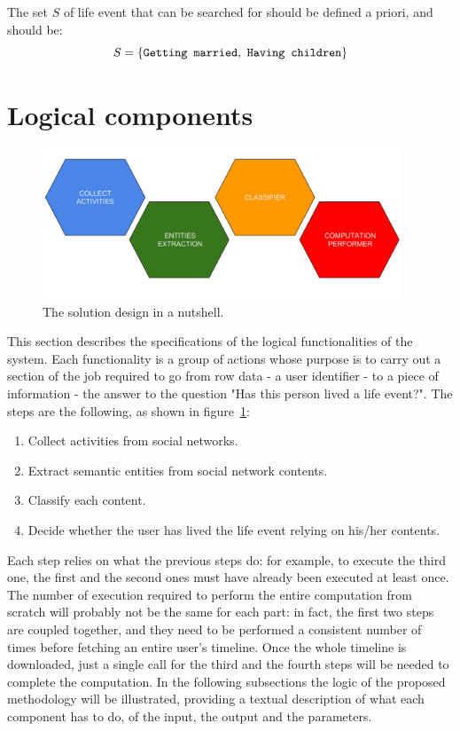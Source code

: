 The set $S$ of life event that can be searched for should be defined a priori, and should be: 
\[
S = \{\text{\texttt{Getting married}}, \text{ \texttt{Having children}}\}
\]

\section{Logical components}
\label{sec:logicdescr}

\begin{figure}[b]
\centering
\includegraphics[width=%
0.95\textwidth]{img/Solutiondesign_nutshell}
\caption{The solution design in a nutshell.}
\label{fig:nutshell}
\end{figure}

This section describes the specifications of the logical functionalities of the system. Each functionality is a group of actions whose purpose is to carry out a section of the job required to go from row data - a user identifier - to a piece of information - the answer to the question "Has this person lived a life event?". The steps are the following, as shown in figure~\ref{fig:nutshell}:
\begin{enumerate}
\item Collect activities from social networks.
\item Extract semantic entities from social network contents.
\item Classify each content.
\item Decide whether the user has lived the life event relying on his/her contents.
\end{enumerate}
Each step relies on what the previous steps do: for example, to execute the third one, the first and the second ones must have already been executed at least once. The number of execution required to perform the entire computation from scratch will probably not be the same for each part: in fact, the first two steps are coupled together, and they need to be performed a consistent number of times before fetching an entire user's timeline. Once the whole timeline is downloaded, just a single call for the third and the fourth steps will be needed to complete the computation. In the following subsections the logic of the proposed methodology will be illustrated, providing a textual description of what each component has to do, of the input, the output and the parameters. 

